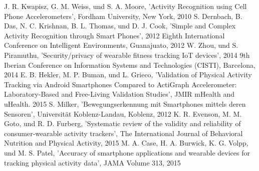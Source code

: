 \documentclass[conference]{IEEEtran}
\begin{document}
\begin{thebibliography}{00}
 J. R. Kwapisz, G. M. Weiss, und S. A. Moore, 'Activity Recognition using Cell Phone Accelerometers', Fordham University, New York, 2010
 S. Dernbach, B. Das, N. C. Krishnan, B. L. Thomas, und D. J. Cook, 'Simple and Complex Activity Recognition through Smart Phones', 2012 Eighth International Conference on Intelligent Environments, Guanajuato, 2012
 W. Zhou, und S. Piramuthu, 'Security/privacy of wearable fitness tracking IoT devices', 2014 9th Iberian Conference on Information Systems and Technologies (CISTI), Barcelona, 2014
 E. B. Hekler, M. P. Buman, und L. Grieco, 'Validation of Physical Activity Tracking via Android Smartphones Compared to ActiGraph Accelerometer: Laboratory-Based and Free-Living Validation Studies', JMIR mHealth and uHealth. 2015
 S. Milker, 'Bewegungserkennung mit Smartphones mittels deren Sensoren', Universität Koblenz-Landau, Koblenz, 2012
 K. R. Evenson, M. M. Goto, und R. D. Furberg, 'Systematic review of the validity and reliability of consumer-wearable activity trackers', The International Journal of Behavioral Nutrition and Physical Activity, 2015
 M. A. Case, H. A. Burwick, K. G. Volpp, und M. S. Patel, 'Accuracy of smartphone applications and wearable devices for tracking physical activity data', JAMA Volume 313, 2015
\end{thebibliography}
\end{document}
